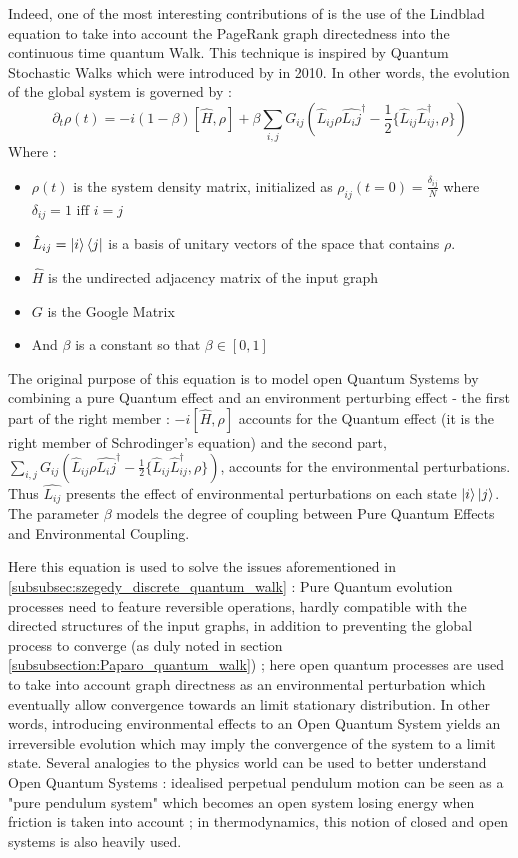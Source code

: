 \documentclass[sn-mathphys]{sn-jnl}%
\theoremstyle{thmstyleone}%
\theoremstyle{thmstyletwo}%
\theoremstyle{thmstylethree}%
\begin{document}
Indeed, one of the most interesting contributions of
\cite{sanchez-burillo_duch_gomez-gardenes_zueco_2012} is the use of
the Lindblad equation to take into account the PageRank graph
directedness into the continuous time quantum Walk. This technique is
inspired by Quantum Stochastic Walks which were introduced by
\cite{whitfield_rodriguez-rosario_aspuru-guzik_2010} in 2010. In other
words, the evolution of the global system is governed by :
\begin{equation}\label{lindblad_general_form}
\partial_t \rho(t) = -i (1- \beta) [\hat{H}, \rho] + \beta \sum_{i,j} G_{ij} (\hat{L}_{ij} \rho \hat{L_ij}^{\dagger} - \frac{1}{2}\{\hat{L}_{ij} \hat{L}_{ij}^\dagger, \rho\})
\end{equation}
Where :
\begin{itemize}
\item $\rho(t)$ is the system density matrix, initialized as
  $\rho_{ij}(t=0) = \frac{\delta_{ij}}{N}$ where
  $\delta_{ij} = 1 \mbox{ iff } i=j$
\item $\hat{L}_{ij} = \ket{i}\bra{j}$ is a basis of unitary vectors of
  the space that contains $\rho$.
\item $\hat{H}$ is the undirected adjacency matrix of the input graph
\item $G$ is the Google Matrix
\item And $\beta$ is a constant so that $\beta \in [0,1]$
\end{itemize}

The original purpose of this equation is to model open Quantum Systems
by combining a pure Quantum effect and an environment perturbing
effect - the first part of the right member : $-i [\hat{H}, \rho]$
accounts for the Quantum effect (it is the right member of
Schrodinger's equation) and the second part,
$\sum_{i,j} G_{ij} (\hat{L}_{ij} \rho \hat{L_ij}^{\dagger} -
\frac{1}{2}\{\hat{L}_{ij} \hat{L}_{ij}^\dagger, \rho\})$, accounts for
the environmental perturbations. Thus $\hat{L_{ij}}$ presents the
effect of environmental perturbations on each state
$\ket{i}\ket{j}$. The parameter $\beta$ models the degree of coupling
between Pure Quantum Effects and Environmental Coupling.

Here this equation is used to solve the issues aforementioned in
\ref{subsubsec:szegedy_discrete_quantum_walk} : Pure Quantum evolution
processes need to feature reversible operations, hardly compatible
with the directed structures of the input graphs, in addition to
preventing the global process to converge (as duly noted in section
\ref{subsubsection:Paparo_quantum_walk}) ; here open quantum processes
are used to take into account graph directness as an environmental
perturbation which eventually allow convergence towards an limit
stationary distribution. In other words, introducing environmental
effects to an Open Quantum System yields an irreversible evolution
which may imply the convergence of the system to a limit
state. Several analogies to the physics world can be used to better
understand Open Quantum Systems : idealised perpetual pendulum motion
can be seen as a "pure pendulum system" which becomes an open system
losing energy when friction is taken into account ; in thermodynamics,
this notion of closed and open systems is also heavily used.
\end{document}
